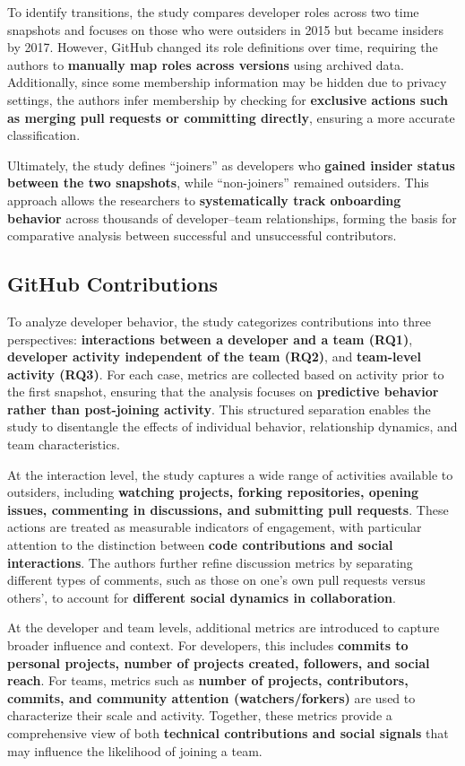 To identify transitions, the study compares developer roles across two time snapshots and focuses on those who were outsiders in 2015 but became insiders by 2017. However, GitHub changed its role definitions over time, requiring the authors to \textbf{manually map roles across versions} using archived data. Additionally, since some membership information may be hidden due to privacy settings, the authors infer membership by checking for \textbf{exclusive actions such as merging pull requests or committing directly}, ensuring a more accurate classification.

Ultimately, the study defines “joiners” as developers who \textbf{gained insider status between the two snapshots}, while “non-joiners” remained outsiders. This approach allows the researchers to \textbf{systematically track onboarding behavior} across thousands of developer–team relationships, forming the basis for comparative analysis between successful and unsuccessful contributors.


\subsection{GitHub Contributions}
To analyze developer behavior, the study categorizes contributions into three perspectives: \textbf{interactions between a developer and a team (RQ1)}, \textbf{developer activity independent of the team (RQ2)}, and \textbf{team-level activity (RQ3)}. For each case, metrics are collected based on activity prior to the first snapshot, ensuring that the analysis focuses on \textbf{predictive behavior rather than post-joining activity}. This structured separation enables the study to disentangle the effects of individual behavior, relationship dynamics, and team characteristics.

At the interaction level, the study captures a wide range of activities available to outsiders, including \textbf{watching projects, forking repositories, opening issues, commenting in discussions, and submitting pull requests}. These actions are treated as measurable indicators of engagement, with particular attention to the distinction between \textbf{code contributions and social interactions}. The authors further refine discussion metrics by separating different types of comments, such as those on one’s own pull requests versus others’, to account for \textbf{different social dynamics in collaboration}.

At the developer and team levels, additional metrics are introduced to capture broader influence and context. For developers, this includes \textbf{commits to personal projects, number of projects created, followers, and social reach}. For teams, metrics such as \textbf{number of projects, contributors, commits, and community attention (watchers/forkers)} are used to characterize their scale and activity. Together, these metrics provide a comprehensive view of both \textbf{technical contributions and social signals} that may influence the likelihood of joining a team.

